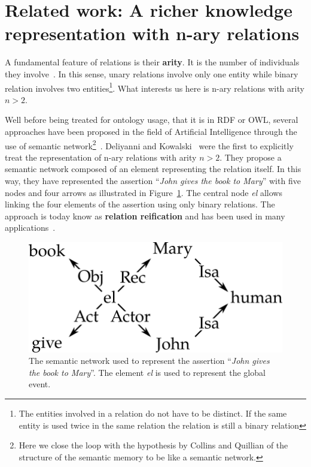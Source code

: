 \section[Related work]{Related work: A richer knowledge representation with n-ary relations}

A fundamental feature of relations is their \textbf{arity}. It is the number of individuals they involve~\cite{giunti_2019_representing}. In this sense, unary relations involve only one entity while binary relation involves two entities\footnote{The entities involved in a relation do not have to be distinct. If the same entity is used twice in the same relation the relation is still a binary relation}. What interests us here is n-ary relations with arity $n > 2$.

Well before being treated for ontology usage, that it is in RDF or OWL, several approaches have been proposed in the field of Artificial Intelligence through the use of semantic network\footnote{Here we close the loop with the hypothesis by Collins and Quillian of the structure of the semantic memory to be like a semantic network.}~\cite{brachman_1979_epistemological, sowa_2014_principles}. Deliyanni and Kowalski~\cite{deliyanni_1979_logic} were the first to explicitly treat the representation of n-ary relations with arity $n > 2$. They propose a semantic network composed of an element representing the relation itself. In this way, they have represented the assertion ``\textit{John gives the book to Mary}'' with five nodes and four arrows as illustrated in Figure~\ref{fig:chap7_sem_net}. The central node \textit{el} allows linking the four elements of the assertion using only binary relations. The approach is today know as \textbf{relation reification} and has been used in many applications~\cite{gangemi_2008_norms, welty_2006_reusable}.

\begin{figure}[ht!]
\centering
\includegraphics[scale=0.5]{figures/chapter7/semantic_net.png}
\caption{\label{fig:chap7_sem_net} The semantic network used to represent the assertion ``\textit{John gives the book to Mary}''. The element \textit{el} is used to represent the global event.}
\end{figure}

